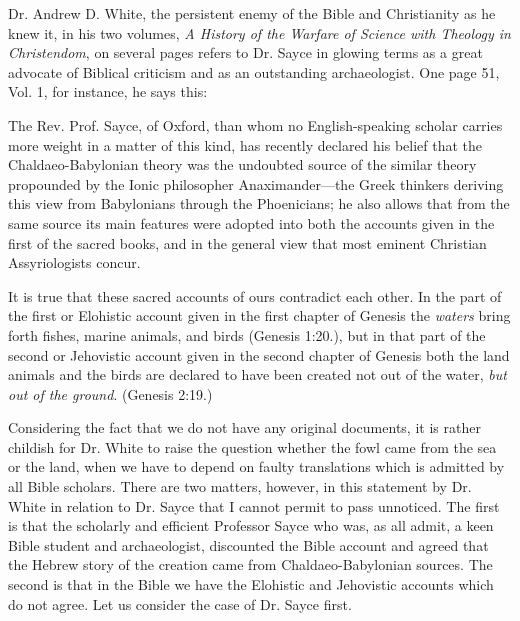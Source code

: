 Dr. Andrew D. White, the persistent enemy of the Bible and Christianity as he knew it, in his
two volumes, \textit{A History of the Warfare of Science with Theology in Christendom}, on several
pages refers to Dr. Sayce in glowing terms as a great advocate of Biblical criticism and as an
outstanding archaeologist. One page 51, Vol. 1, for instance, he says this:

The Rev. Prof. Sayce, of Oxford, than whom no English-speaking scholar carries more
weight in a matter of this kind, has recently declared his belief that the Chaldaeo-Babylonian
theory was the undoubted source of the similar theory propounded by the Ionic philosopher
Anaximander—the Greek thinkers deriving this view from Babylonians through the
Phoenicians; he also allows that from the same source its main features were adopted into
both the accounts given in the first of the sacred books, and in the general view that most
eminent Christian Assyriologists concur.

It is true that these sacred accounts of ours contradict each other. In the part of the first or
Elohistic account given in the first chapter of Genesis the \textit{waters} bring forth fishes, marine
animals, and birds (Genesis 1:20.), but in that part of the second or Jehovistic account given
in the second chapter of Genesis both the land animals and the birds are declared to have
been created not out of the water, \textit{but out of the ground}. (Genesis 2:19.)

Considering the fact that we do not have any original documents, it is rather childish for Dr.
White to raise the question whether the fowl came from the sea or the land, when we have to
depend on faulty translations which is admitted by all Bible scholars. There are two matters,
however, in this statement by Dr. White in relation to Dr. Sayce that I cannot permit to pass
unnoticed. The first is that the scholarly and efficient Professor Sayce who was, as all admit,
a keen Bible student and archaeologist, discounted the Bible account and agreed that the
Hebrew story of the creation came from Chaldaeo-Babylonian sources. The second is that in
the Bible we have the Elohistic and Jehovistic accounts which do not agree. Let us consider
the case of Dr. Sayce first.

